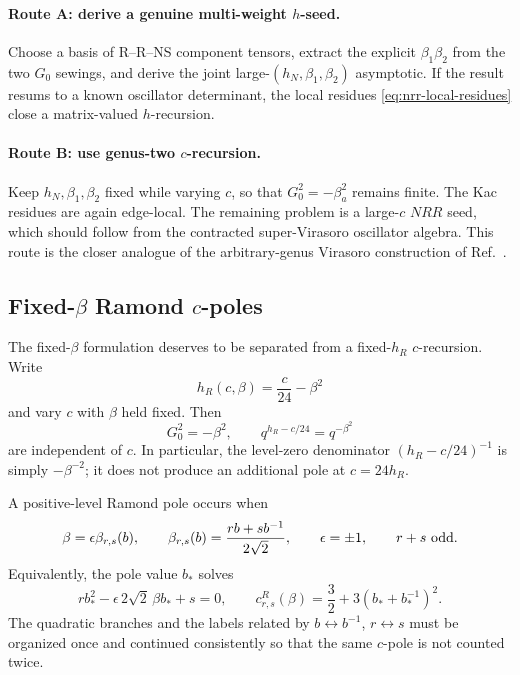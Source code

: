 \documentclass[11pt]{article}
\begin{document}
\paragraph{Route A: derive a genuine multi-weight \(h\)-seed.}
Choose a basis of R--R--NS component tensors, extract the explicit
\(\beta_1\beta_2\) from the two \(G_0\) sewings, and derive the joint
large-\((h_N,\beta_1,\beta_2)\) asymptotic.  If the result resums to a known
oscillator determinant, the local residues
\eqref{eq:nrr-local-residues} close a matrix-valued \(h\)-recursion.

\paragraph{Route B: use genus-two \(c\)-recursion.}
Keep \(h_N,\beta_1,\beta_2\) fixed while varying \(c\), so that
\(G_0^2=-\beta_a^2\) remains finite.  The Kac residues are again edge-local.
The remaining problem is a large-\(c\) \(NRR\) seed, which should follow
from the contracted super-Virasoro oscillator algebra.  This route is the
closer analogue of the arbitrary-genus Virasoro construction of
Ref.~\cite{ChoCollierYin2017Recursive}.

\subsection{\texorpdfstring{Fixed-\(\beta\) Ramond \(c\)-poles}{Fixed-beta Ramond c-poles}}
\label{sec:fixed-beta-c-poles}

The fixed-\(\beta\) formulation deserves to be separated from a
fixed-\(h_R\) \(c\)-recursion.  Write
\begin{equation}
 h_R(c,\beta)=\frac{c}{24}-\beta^2
 \end{equation}
and vary \(c\) with \(\beta\) held fixed.  Then
\begin{equation}
 G_0^2=-\beta^2,
 \qquad
 q^{h_R-c/24}=q^{-\beta^2}
 \label{eq:fixed-beta-benefits}
\end{equation}
are independent of \(c\).  In particular, the level-zero denominator
\((h_R-c/24)^{-1}\) is simply \(-\beta^{-2}\); it does not produce an
additional pole at \(c=24h_R\).

A positive-level Ramond pole occurs when
\begin{equation}
 \beta=\epsilon\beta_{r,s}(b),
 \qquad
 \beta_{r,s}(b)=\frac{rb+s b^{-1}}{2\sqrt2},
 \qquad
 \epsilon=\pm1,
 \qquad
 r+s\ {\rm odd}.
 \label{eq:fixed-beta-degeneracy}
\end{equation}
Equivalently, the pole value \(b_*\) solves
\begin{equation}
 r b_*^2-\epsilon\,2\sqrt2\,\beta b_*+s=0,
 \qquad
 c^{R}_{r,s}(\beta)
 =
 \frac32+3\left(b_*+b_*^{-1}\right)^2.
 \label{eq:fixed-beta-c-pole}
\end{equation}
The quadratic branches and the labels related by
\(b\leftrightarrow b^{-1}\), \(r\leftrightarrow s\) must be organized once
and continued consistently so that the same \(c\)-pole is not counted
twice.
\end{document}
